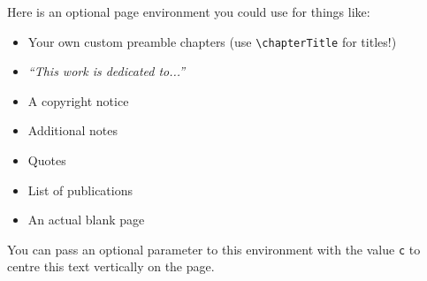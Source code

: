 
\begin{blankpage}
	Here is an optional page environment you could use for things like:
	\begin{itemize}
		\item Your own custom preamble chapters (use \texttt{\textbackslash chapterTitle} for titles!)
		\item \emph{``This work is dedicated to...''}
		\item A copyright notice
		\item Additional notes
		\item Quotes
		\item List of publications
		\item An actual blank page
	\end{itemize}
	You can pass an optional parameter to this environment with the value \texttt{c} to centre this text vertically on the page.
\end{blankpage}
